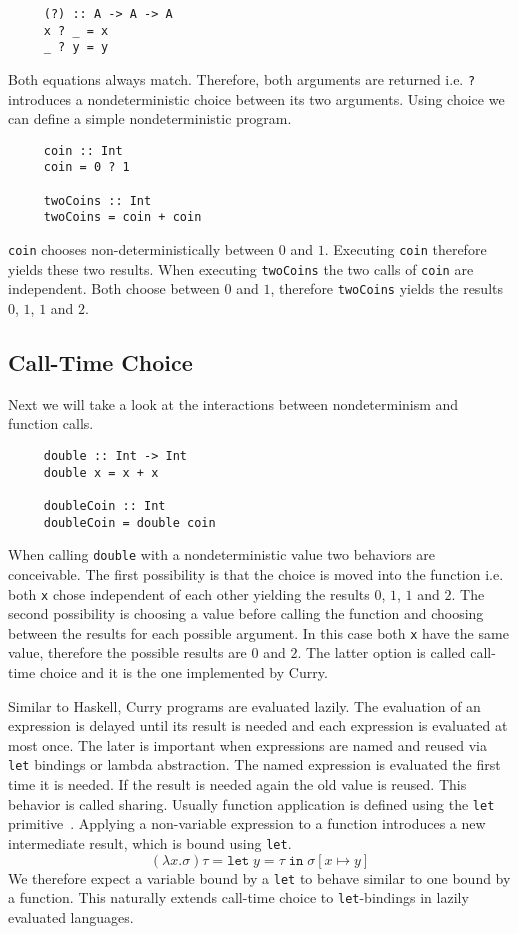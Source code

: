 \begin{verbatim}
     (?) :: A -> A -> A
     x ? _ = x
     _ ? y = y
\end{verbatim}
Both equations always match.
Therefore, both arguments are returned i.e. \texttt{?} introduces a
nondeterministic choice between its two arguments.
Using choice we can define a simple nondeterministic program.

\begin{verbatim}
     coin :: Int
     coin = 0 ? 1

     twoCoins :: Int
     twoCoins = coin + coin
\end{verbatim}
\texttt{coin} chooses non-deterministically between $0$ and $1$.
Executing \texttt{coin} therefore yields these two results.
When executing \texttt{twoCoins} the two calls of \texttt{coin} are independent.
Both choose between $0$ and $1$, therefore \texttt{twoCoins} yields the results
$0$, $1$, $1$ and $2$.

\subsection{Call-Time Choice}
\label{call-time-choice}
Next we will take a look at the interactions between nondeterminism and function
calls.

\begin{verbatim}
     double :: Int -> Int
     double x = x + x
     
     doubleCoin :: Int
     doubleCoin = double coin
\end{verbatim}
When calling \texttt{double} with a nondeterministic value two behaviors are
conceivable.
The first possibility is that the choice is moved into the function i.e. both
\texttt{x} chose independent of each other yielding the results $0$, $1$, $1$
and $2$.
The second possibility is choosing a value before calling the function and
choosing between the results for each possible argument.
In this case both \texttt{x} have the same value, therefore the possible results
are $0$ and $2$.
The latter option is called call-time choice and it is the one implemented by
Curry.

Similar to Haskell, Curry programs are evaluated lazily.
The evaluation of an expression is delayed until its result is needed and each
expression is evaluated at most once.
The later is important when expressions are named and reused via \texttt{let}
bindings or lambda abstraction.
The named expression is evaluated the first time it is needed.
If the result is needed again the old value is reused.
This behavior is called sharing.
Usually function application is defined using the \texttt{let}
primitive~\cite{DBLP:conf/popl/Launchbury93}.
Applying a non-variable expression to a function introduces a new intermediate
result, which is bound using \texttt{let}.
$$
(\lambda x.\sigma) \tau = \texttt{let}\;y = \tau\;\texttt{in}\;\sigma[x\mapsto y]
$$
We therefore expect a variable bound by a \texttt{let} to behave similar to one
bound by a function.
This naturally extends call-time choice to \texttt{let}-bindings in lazily
evaluated languages.

